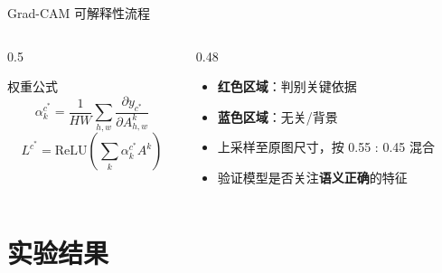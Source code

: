 \documentclass[aspectratio=169, 11pt]{ctexbeamer}
\begin{document}
\begin{frame}{Grad-CAM 可解释性流程}
\vspace{0.2em}
\begin{columns}[T]
  \begin{column}{0.5\linewidth}
    \begin{block}{\footnotesize 权重公式}
    \footnotesize\vspace{-0.3em}
    \[ \alpha_k^{c^*} = \frac{1}{HW}\sum_{h,w}\frac{\partial y_{c^*}}{\partial A_{h,w}^k} \]
    \[ L^{c^*} = \mathrm{ReLU}\left(\sum_k \alpha_k^{c^*} A^k\right) \]
    \end{block}
  \end{column}
  \begin{column}{0.48\linewidth}
    \begin{itemize}\footnotesize
      \item \textbf{红色区域}：判别关键依据
      \item \textbf{蓝色区域}：无关/背景
      \item 上采样至原图尺寸，按 0.55 : 0.45 混合
      \item 验证模型是否关注\textbf{语义正确}的特征
    \end{itemize}
  \end{column}
\end{columns}
\end{frame}

\section{实验结果}
\end{document}
